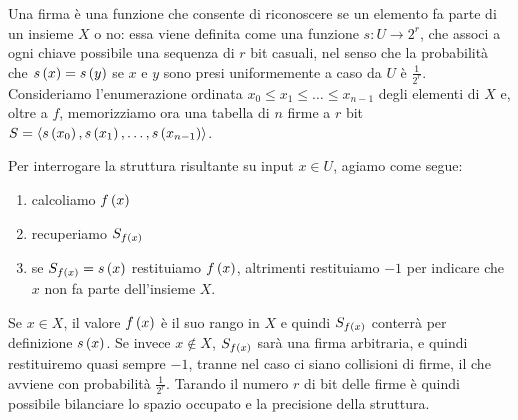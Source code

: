 \documentclass[\main/main.tex]{subfiles}
\begin{document}
\begin{definition}[Firma]
    Una firma è una funzione che consente di riconoscere se un elemento fa parte di un insieme \(X\) o no: essa viene definita come una funzione \(s: U \rightarrow 2^r\), che associ a ogni chiave possibile una sequenza di \(r\) bit casuali, nel senso che la probabilità che \(s\left(x\right) = s\left(y\right)\) se \(x\) e \(y\) sono presi uniformemente a caso da \(U\) è \(\frac{1}{2^r}\). Consideriamo l'enumerazione ordinata \(x_0 \leq x_1 \leq \ldots \leq x_{n-1}\) degli elementi di \(X\) e, oltre a \(f\), memorizziamo ora una tabella di \(n\) firme a \(r\) bit \(S = \left\langle s\left(x_0\right), s\left(x_1\right), \ldots, s\left(x_{n-1}\right)\right\rangle\).
    
    Per interrogare la struttura risultante su input \(x \in U\), agiamo come segue:
    \begin{enumerate}
        \item calcoliamo \(f\left(x\right)\)
        \item recuperiamo \(S_{f\left(x\right)}\)
        \item se \(S_{f\left(x\right)} = s\left(x\right)\) restituiamo \(f\left(x\right)\), altrimenti restituiamo \(-1\) per indicare che \(x\) non fa parte dell'insieme \(X\).
    \end{enumerate}
    Se \(x \in X\), il valore \(f\left(x\right)\) è il suo rango in \(X\) e quindi \(S_{f\left(x\right)}\) conterrà per definizione \(s\left(x\right)\). Se invece \(x \not\in X\), \(S_{f\left(x\right)}\) sarà una firma arbitraria, e quindi restituiremo quasi sempre \(-1\), tranne nel caso ci siano collisioni di firme, il che avviene con probabilità \(\frac{1}{2^r}\). Tarando il numero \(r\) di bit delle firme è quindi possibile bilanciare lo spazio occupato e la precisione della struttura.
\end{definition}
\end{document}
